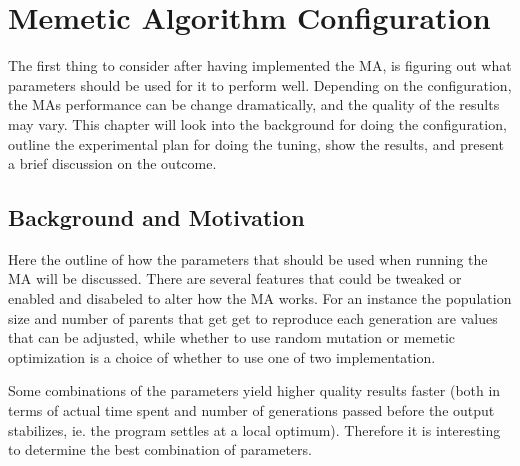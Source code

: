 \chapter{Memetic Algorithm Configuration} %
\label{cha:evolutionary_algorithm_configuration}

The first thing to consider after having implemented the MA, is figuring out what parameters should be used for it to perform well. Depending on the configuration, the MAs performance can be change dramatically, and the quality of the results may vary. This chapter will look into the background for doing the configuration, outline the experimental plan for doing the tuning, show the results, and present a brief discussion on the outcome.

\section{Background and Motivation} %
\label{sec:background_and_motivation}
Here the outline of how the parameters that should be used when running the MA will be discussed. There are several features that could be tweaked or enabled and disabeled to alter how the MA works. For an instance the population size and number of parents that get get to reproduce each generation are values that can be adjusted, while whether to use random mutation or memetic optimization is a choice of whether to use one of two implementation.

Some combinations of the parameters yield higher quality results faster (both in terms of actual time spent and number of generations passed before the output stabilizes, ie. the program settles at a local optimum). Therefore it is interesting to determine the best combination of parameters.

